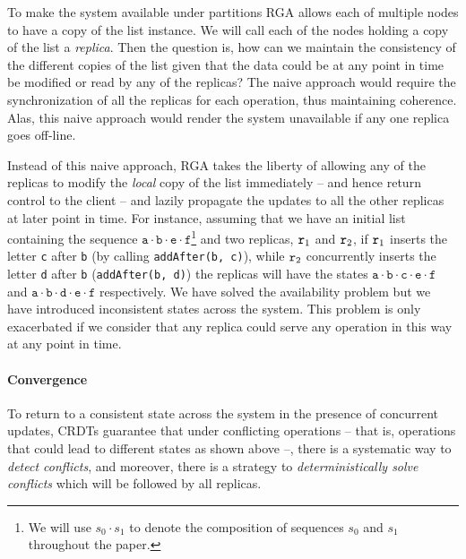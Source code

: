 To make the system available under partitions RGA allows each of
multiple nodes to have a copy of the list instance.
%
We will call each of the nodes holding a copy of the list a \emph{replica}.
%
Then the question is, how can we maintain the consistency of the
different copies of the list given that the data could be at any point
in time be modified or read by any of the replicas?
%
The naive approach would require the synchronization of all the
replicas for each operation, thus maintaining coherence.
%
Alas, this naive approach would render the system unavailable if any
one replica goes off-line.
%

Instead of this naive approach, RGA takes the liberty of allowing any
of the replicas to modify the \emph{local} copy of the list immediately --
and hence return control to the client -- and lazily propagate the
updates to all the other replicas at later point in time.
%
For instance, assuming that we have an initial list containing the
sequence $\mathtt{a \cdot b \cdot e \cdot f}$\footnote{We will use
  $s_0 \cdot s_1$ to denote the composition of sequences $s_0$ and
  $s_1$ throughout the paper.}
and two replicas, $\mathtt{r}_1$ and $\mathtt{r}_2$, if $\mathtt{r}_1$ inserts the
letter \lstinline|c| after \lstinline|b| (by calling
\lstinline|addAfter(b, c)|), while $\mathtt{r}_2$ concurrently inserts the
letter \lstinline|d| after \lstinline|b| (\lstinline|addAfter(b, d)|)
the replicas will have the states $\mathtt{a \cdot b \cdot c \cdot e
  \cdot f}$ and $\mathtt{a \cdot b \cdot d \cdot e \cdot f}$
respectively.
%
We have solved the availability problem but we have introduced
inconsistent states across the system.
%
This problem is only exacerbated if we consider that any replica could
serve any operation in this way at any point in time.

\paragraph{Convergence}

To return to a consistent state across the system in the presence of
concurrent updates, CRDTs guarantee that under conflicting operations --
that is, operations that could lead to different states as shown above
--, there is a systematic way to \emph{detect conflicts}, and moreover, there
is a strategy to \emph{deterministically solve conflicts} which will be followed
by all replicas. 


